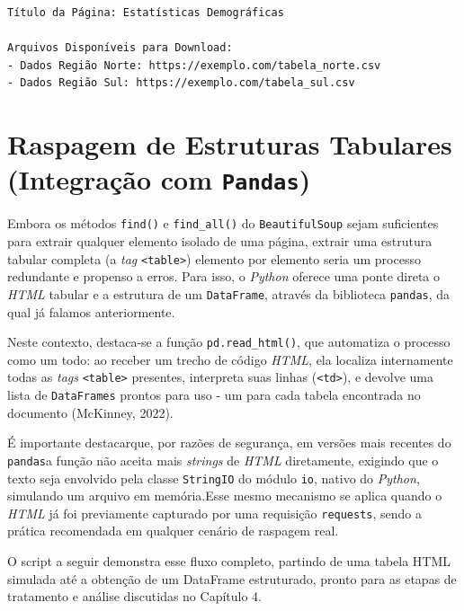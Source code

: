 \documentclass[
  brazilian,
  letterpaper,
  DIV=11,
  numbers=noendperiod]{scrreprt}
\begin{document}
\begin{verbatim}
Título da Página: Estatísticas Demográficas

Arquivos Disponíveis para Download:
- Dados Região Norte: https://exemplo.com/tabela_norte.csv
- Dados Região Sul: https://exemplo.com/tabela_sul.csv
\end{verbatim}

\section{\texorpdfstring{Raspagem de Estruturas Tabulares (Integração
com
\texttt{Pandas})}{Raspagem de Estruturas Tabulares (Integração com Pandas)}}\label{raspagem-de-estruturas-tabulares-integrauxe7uxe3o-com-pandas}

Embora os métodos \texttt{find()} e \texttt{find\_all()} do
\texttt{BeautifulSoup} sejam suficientes para extrair qualquer elemento
isolado de uma página, extrair uma estrutura tabular completa (a
\emph{tag} \texttt{\textless{}table\textgreater{}}) elemento por
elemento seria um processo redundante e propenso a erros. Para isso, o
\emph{Python} oferece uma ponte direta o \emph{HTML} tabular e a
estrutura de um \texttt{DataFrame}, através da biblioteca
\texttt{pandas}, da qual já falamos anteriormente.

Neste contexto, destaca-se a função \texttt{pd.read\_html()}, que
automatiza o processo como um todo: ao receber um trecho de código
\emph{HTML}, ela localiza internamente todas as \emph{tags}
\texttt{\textless{}table\textgreater{}} presentes, interpreta suas
linhas (\texttt{\textless{}td\textgreater{}}), e devolve uma lista de
\texttt{DataFrames} prontos para uso - um para cada tabela encontrada no
documento (McKinney, 2022).

É importante destacarque, por razões de segurança, em versões mais
recentes do \texttt{pandas}a função não aceita mais \emph{strings} de
\emph{HTML} diretamente, exigindo que o texto seja envolvido pela classe
\texttt{StringIO} do módulo \texttt{io}, nativo do \emph{Python},
simulando um arquivo em memória.Esse mesmo mecanismo se aplica quando o
\emph{HTML} já foi previamente capturado por uma requisição
\texttt{requests}, sendo a prática recomendada em qualquer cenário de
raspagem real.

O script a seguir demonstra esse fluxo completo, partindo de uma tabela
HTML simulada até a obtenção de um DataFrame estruturado, pronto para as
etapas de tratamento e análise discutidas no Capítulo 4.
\end{document}

